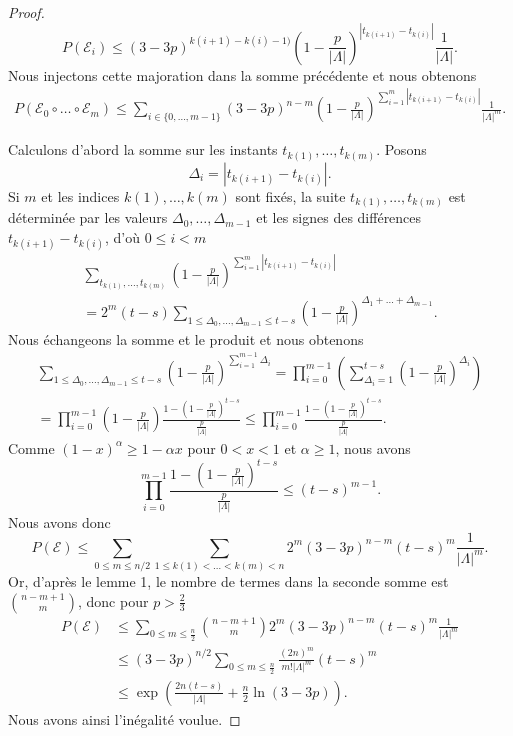 \documentclass[titlepage,a4paper,12pt]{article}
\newcounter{d}
\newcounter{t}
\newcounter{p}
\newcounter{c}
\newcounter{a}
\newcounter{l}
\begin{document}
\begin{proof}
$$P(\mathcal{E}_i)\leqslant (3-3p)^{k(i+1)-k(i)-1)}\left(1-\frac{p}{|\Lambda|}\right)^{|t_{k(i+1)}-t_{k(i)}|}\frac{1}{|\Lambda|}.$$
Nous injectons cette majoration dans la somme précédente et nous obtenons
\begin{multline*}
P(\mathcal{E}_0\circ\dots\circ \mathcal{E}_m) \leqslant \sum_{i\in \{0,\dots,m-1\}}(3-3p)^{n-m}\left(1-\frac{p}{|\Lambda|}\right)^{\displaystyle \sum_{i=1}^{m}|t_{k(i+1)}-t_{k(i)}|}\frac{1}{|\Lambda|^m}.
\end{multline*}

Calculons d'abord la somme sur les instants $t_{k(1)},\dots,t_{k(m)}$. Posons $$\Delta_i = |t_{k(i+1)}-t_{k(i)}|.$$ Si $m$ et les indices $k(1),\dots,k(m)$ sont fixés, la suite $t_{k(1)},\dots,t_{k(m)}$ est déterminée par les valeurs $\Delta_0,\dots,\Delta_{m-1}$ et les signes des différences $t_{k(i+1)}-t_{k(i)}$, d'où $0\leqslant i < m$
\begin{multline*}\sum_{t_{k(1)},\dots,t_{k(m)}}\left(1-\frac{p}{|\Lambda|}\right)^{\displaystyle\sum_{i=1}^{m}|t_{k(i+1)}-t_{k(i)}|} \\ = 2^{m}(t-s)\sum_{1\leqslant\Delta_0,\dots,\Delta_{m-1}\leqslant t-s}\left(1-\frac{p}{|\Lambda|}\right)^{\Delta_1+\dots+\Delta_{m-1}}.
\end{multline*}
Nous échangeons la somme et le produit et nous obtenons
\begin{multline*}\sum_{1\leqslant\Delta_0,\dots,\Delta_{m-1}\leqslant t-s}\left(1-\frac{p}{|\Lambda|}\right)^{\sum_{i=1}^{m-1}\Delta_i} = \prod_{i=0}^{m-1}\left(\sum_{\Delta_i = 1}^{t-s}\left(1-\frac{p}{|\Lambda|}\right)^{\Delta_i}\right)\\= \prod_{i=0}^{m-1}\left(1-\frac{p}{|\Lambda|}\right)\frac{\displaystyle1-\left(1-\frac{p}{|\Lambda|}\right)^{t-s}}{\displaystyle\frac{p}{|\Lambda|}}\leqslant \prod_{i=0}^{m-1}\frac{\displaystyle1-\left(1-\frac{p}{|\Lambda|}\right)^{t-s}}{\displaystyle\frac{p}{|\Lambda|}}.
\end{multline*}
Comme $(1-x)^\alpha \geqslant 1-\alpha x$ pour $0<x<1$ et $\alpha\geqslant 1$, nous avons 
$$ \prod_{i=0}^{m-1}\frac{\displaystyle 1-\left(1-\frac{p}{|\Lambda|}\right)^{t-s}}{\displaystyle\frac{p}{|\Lambda|}} \leqslant(t-s)^{m-1}.
$$
Nous avons donc
$$P(\mathcal{E}) \leqslant\sum_{0\leqslant m \leqslant n/2}\sum_{1\leqslant k(1)<\dots<k(m)<n} 2^{m}(3-3p)^{n-m}(t-s)^m\frac{1}{|\Lambda|^m}.
$$
Or, d'après le lemme 1, le nombre de termes dans la seconde somme est $\binom{n-m+1}{m}$, donc pour $p> \frac{2}{3}$
\begin{align*}P\left(\mathcal{E}\right)& \leqslant\sum_{0\leqslant m \leqslant\frac{n}{2}}\binom{n-m+1}{m} 2^{m}(3-3p)^{n-m}(t-s)^m\frac{1}{|\Lambda|^m}\\
& \leqslant (3-3p)^{n/2}\sum_{0\leqslant m \leqslant\frac{n}{2}}\frac{(2n)^m}{m!|\Lambda|^m}(t-s)^m \\
&\leqslant \exp\left(\frac{2n(t-s)}{|\Lambda|}+\frac{n}{2}\ln(3-3p)\right).
\end{align*}
Nous avons ainsi l'inégalité voulue.
\end{proof}
\end{document}
